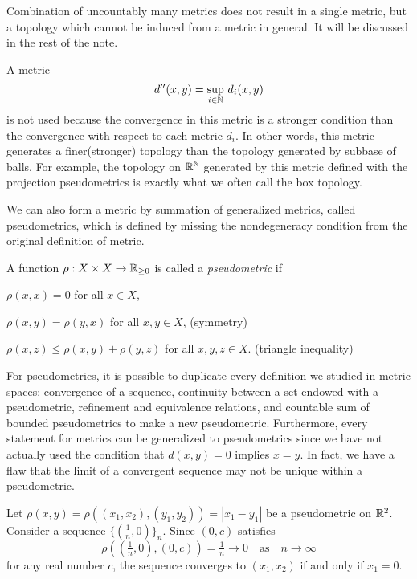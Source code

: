 \documentclass{../note}
\begin{document}
Combination of uncountably many metrics does not result in a single metric, but a topology which cannot be induced from a metric in general.
It will be discussed in the rest of the note.

\begin{rmk}
A metric
\[d''(x,y)=\sup_{i\in\mathbb{N}}\,d_i(x,y)\]
is not used because the convergence in this metric is a stronger condition than the convergence with respect to each metric $d_i$.
In other words, this metric generates a finer(stronger) topology than the topology generated by subbase of balls.
For example, the topology on $\mathbb{R}^{\mathbb{N}}$ generated by this metric defined with the projection pseudometrics is exactly what we often call the box topology.
\end{rmk}


We can also form a metric by summation of generalized metrics, called pseudometrics, which is defined by missing the nondegeneracy condition from the original definition of metric.

\begin{defn}
A function $\rho:X\times X\to\mathbb{R}_{\ge0}$ is called a \emph{pseudometric} if
\begin{parts}
\item $\rho(x,x)=0$ for all $x\in X$,
\item $\rho(x,y)=\rho(y,x)$ for all $x,y\in X$, \hfill(symmetry)
\item $\rho(x,z)\le \rho(x,y)+\rho(y,z)$ for all $x,y,z\in X$. \hfill(triangle inequality)
\end{parts}
\end{defn}

For pseudometrics, it is possible to duplicate every definition we studied in metric spaces: convergence of a sequence, continuity between a set endowed with a pseudometric, refinement and equivalence relations, and countable sum of bounded pseudometrics to make a new pseudometric.
Furthermore, every statement for metrics can be generalized to pseudometrics since we have not actually used the condition that $d(x,y)=0$ implies $x=y$.
In fact, we have a flaw that the limit of a convergent sequence may not be unique within a pseudometric.

\begin{ex}
Let $\rho(x,y)=\rho((x_1,x_2),(y_1,y_2))=|x_1-y_1|$ be a pseudometric on $\mathbb{R}^2$.
Consider a sequence $\{(\frac1n,0)\}_n$.
Since $(0,c)$ satisfies 
\[\rho((\tfrac1n,0),(0,c))=\tfrac1n\to0\quad\text{as}\quad n\to\infty\]
for any real number $c$, the sequence converges to $(x_1,x_2)$ if and only if $x_1=0$.
\end{ex}
\end{document}
